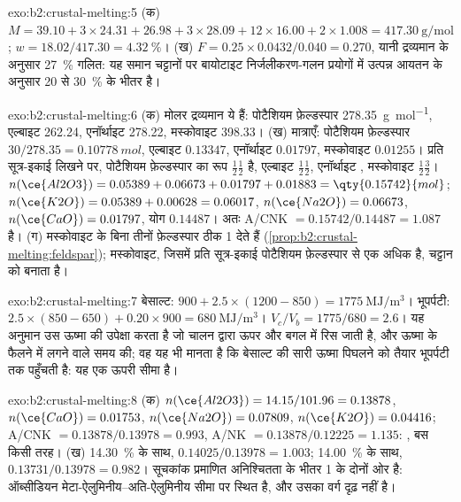 \begin{solution}{exo:b2:crustal-melting:5}
(क) $M = 39.10 + 3\times24.31 + 26.98 + 3\times28.09 + 12\times16.00 + 2\times1.008 =
\qty{417.30}{\gram\per\mole}$; $w = 18.02/417.30 = \qty{4.32}{\percent}$।
(ख) $F = 0.25\times0.0432/0.040 = 0.270$, यानी द्रव्यमान के अनुसार \qty{27}{\percent} गलित: यह
समान चट्टानों पर बायोटाइट निर्जलीकरण-गलन प्रयोगों में उत्पन्न आयतन के अनुसार 20 से \qty{30}{\percent}
के भीतर है।
\end{solution}

\begin{solution}{exo:b2:crustal-melting:6}
(क) मोलर द्रव्यमान ये हैं: पोटैशियम फ़ेल्डस्पार \qty{278.35}{\gram\per\mole}, एल्बाइट 262.24, एनॉर्थाइट 278.22, मस्कोवाइट
398.33। (ख) मात्राएँ: पोटैशियम फ़ेल्डस्पार $30/278.35 = \qty{0.10778}{mol}$, एल्बाइट $0.13347$,
एनॉर्थाइट $0.01797$, मस्कोवाइट $0.01255$। प्रति सूत्र-इकाई लिखने पर, पोटैशियम फ़ेल्डस्पार का रूप $\tfrac12$$\tfrac12$ है,
एल्बाइट $\tfrac12$$\tfrac12$, एनॉर्थाइट , मस्कोवाइट
$\tfrac12$$\tfrac32$। $n(\ce{Al2O3}) = 0.05389 +
0.06673 + 0.01797 + 0.01883 = \qty{0.15742}{mol}$; $n(\ce{K2O}) = 0.05389 + 0.00628 =
0.06017$, $n(\ce{Na2O}) = 0.06673$, $n(\ce{CaO}) = 0.01797$, योग $0.14487$।
अतः A/CNK $= 0.15742/0.14487 = 1.087$ है। (ग) मस्कोवाइट के बिना तीनों फ़ेल्डस्पार
ठीक 1 देते हैं (\cref{prop:b2:crustal-melting:feldspar}); मस्कोवाइट, जिसमें प्रति सूत्र-इकाई पोटैशियम फ़ेल्डस्पार से एक 
अधिक है, चट्टान को  बनाता है।
\end{solution}

\begin{solution}{exo:b2:crustal-melting:7}
बेसाल्ट: $900 + 2.5\times(1200 - 850) = \qty{1775}{\mega\joule\per\cubic\metre}$। भूपर्पटी:
$2.5\times(850 - 650) + 0.20\times900 = \qty{680}{\mega\joule\per\cubic\metre}$।
$V_c/V_b = 1775/680 = 2.6$। यह अनुमान उस ऊष्मा की उपेक्षा करता है जो चालन द्वारा ऊपर
और बगल में रिस जाती है, और ऊष्मा के फैलने में लगने वाले समय की; वह यह भी मानता है कि
बेसाल्ट की सारी ऊष्मा पिघलने को तैयार भूपर्पटी तक पहुँचती है: यह एक ऊपरी सीमा है।
\end{solution}

\begin{solution}{exo:b2:crustal-melting:8}
(क) $n(\ce{Al2O3}) = 14.15/101.96 = 0.13878$, $n(\ce{CaO}) = 0.01753$, $n(\ce{Na2O}) =
0.07809$, $n(\ce{K2O}) = 0.04416$; A/CNK $= 0.13878/0.13978 = 0.993$, A/NK $=
0.13878/0.12225 = 1.135$: , बस किसी तरह। (ख) \qty{14.30}{\percent}  के साथ,
$0.14025/0.13978 = 1.003$; \qty{14.00}{\percent} के साथ, $0.13731/0.13978 = 0.982$। सूचकांक
प्रमाणित अनिश्चितता के भीतर 1 के दोनों ओर है: ऑब्सीडियन
मेटा-ऐलुमिनीय--अति-ऐलुमिनीय सीमा पर स्थित है, और उसका वर्ग दृढ़ नहीं है।
\end{solution}

